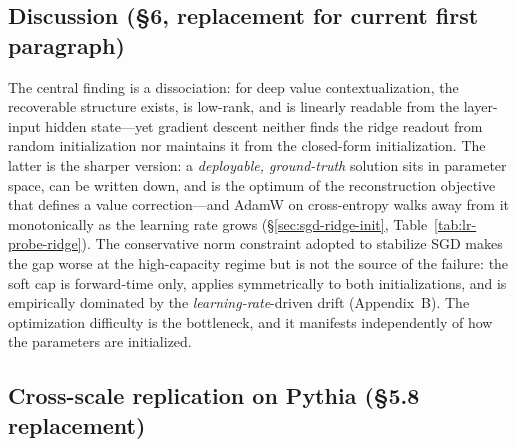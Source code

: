 
\subsection*{Discussion (\S6, replacement for current first paragraph)}

The central finding is a dissociation: for deep value contextualization,
the recoverable structure exists, is low-rank, and is linearly readable
from the layer-input hidden state---yet gradient descent neither finds
the ridge readout from random initialization nor maintains it from the
closed-form initialization. The latter is the sharper version: a
\emph{deployable, ground-truth} solution sits in parameter space, can be
written down, and is the optimum of the reconstruction objective that
defines a value correction---and AdamW on cross-entropy walks away from
it monotonically as the learning rate grows
(\S\ref{sec:sgd-ridge-init}, Table~\ref{tab:lr-probe-ridge}). The
conservative norm constraint adopted to stabilize SGD makes the gap worse
at the high-capacity regime but is not the source of the failure: the
soft cap is forward-time only, applies symmetrically to both
initializations, and is empirically dominated by the
\emph{learning-rate}-driven drift (Appendix~B). The optimization difficulty
is the bottleneck, and it manifests independently of how the parameters
are initialized.


\subsection{Cross-scale replication on Pythia (\S5.8 replacement)}
\label{sec:cross-scale}

